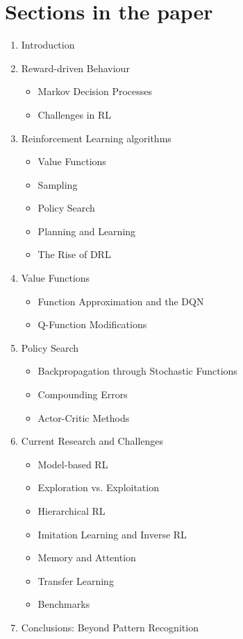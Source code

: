 \documentclass{article}
\begin{document}
\section{Sections in the paper}
\begin{enumerate}
    \item Introduction
    \item Reward-driven Behaviour
    \begin{itemize}
        \item Markov Decision Processes
        \item Challenges in RL
    \end{itemize}
    \item Reinforcement Learning algorithms
    \begin{itemize}
        \item Value Functions
        \item Sampling
        \item Policy Search
        \item Planning and Learning
        \item The Rise of DRL
    \end{itemize}
    \item Value Functions
    \begin{itemize}
        \item Function Approximation and the DQN
        \item Q-Function Modifications
    \end{itemize}
    \item Policy Search
    \begin{itemize}
        \item Backpropagation through Stochastic Functions
        \item Compounding Errors
        \item Actor-Critic Methods
    \end{itemize}
    \item Current Research and Challenges
    \begin{itemize}
        \item Model-based RL
        \item Exploration vs. Exploitation
        \item Hierarchical RL
        \item Imitation Learning and Inverse RL
        \item Memory and Attention
        \item Transfer Learning
        \item Benchmarks
    \end{itemize}
    \item Conclusions: Beyond Pattern Recognition
\end{enumerate}
\end{document}
